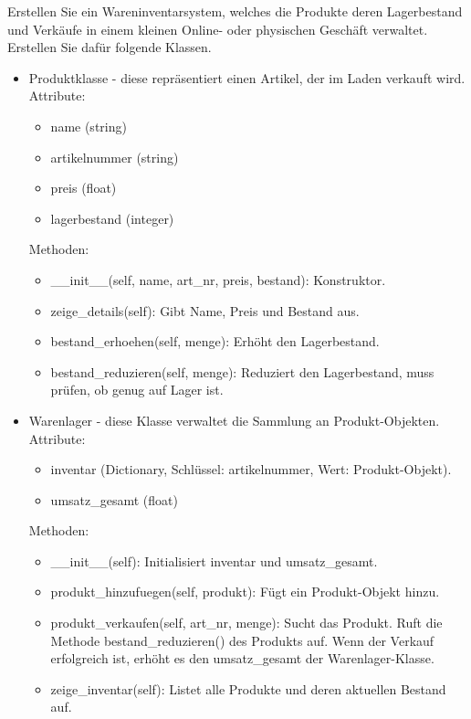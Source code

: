 \begin{myexercise}
	Erstellen Sie ein Wareninventarsystem, welches die Produkte deren Lagerbestand und Verkäufe in einem kleinen Online- oder physischen Geschäft verwaltet. 
	Erstellen Sie dafür folgende Klassen.
	\begin{itemize}
		\item Produktklasse - diese repräsentiert einen Artikel, der im Laden verkauft wird. \\Attribute: 
		\begin{itemize}
			\item name (string) 
			\item artikelnummer (string) 
			\item preis (float) 
			\item lagerbestand (integer)
		\end{itemize}
		Methoden:
		\begin{itemize}
			\item \_\_init\_\_(self, name, art\_nr, preis, bestand): Konstruktor.
			\item zeige\_details(self): Gibt Name, Preis und Bestand aus.
			\item bestand\_erhoehen(self, menge): Erhöht den Lagerbestand.
			\item bestand\_reduzieren(self, menge): Reduziert den Lagerbestand, muss prüfen, ob genug auf Lager ist.
		\end{itemize}
		\item Warenlager - diese Klasse verwaltet die Sammlung an Produkt-Objekten.\\Attribute:
		\begin{itemize}
			\item inventar (Dictionary, Schlüssel: artikelnummer, Wert: Produkt-Objekt).
			\item umsatz\_gesamt (float)
		\end{itemize}
		Methoden:
		\begin{itemize}
			\item \_\_init\_\_(self): Initialisiert inventar und umsatz\_gesamt.
			\item produkt\_hinzufuegen(self, produkt): Fügt ein Produkt-Objekt hinzu.
			\item produkt\_verkaufen(self, art\_nr, menge): Sucht das Produkt. Ruft die Methode bestand\_reduzieren() des Produkts auf. Wenn der Verkauf erfolgreich ist, erhöht es den umsatz\_gesamt der Warenlager-Klasse.
			\item zeige\_inventar(self): Listet alle Produkte und deren aktuellen Bestand auf.

\end{itemize}
\end{itemize}
\end{myexercise}
